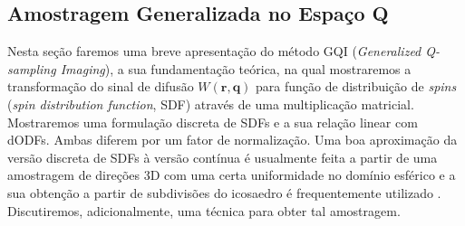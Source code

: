 \documentclass[
    12pt,                %
    oneside,            %
    a4paper,            %
    english,            %
    french,                %
    spanish,            %
    brazil                %
    ]{abntex2}
\begin{document}





\subsection{Amostragem Generalizada no Espaço Q}
\label{sec::gqi}

Nesta seção faremos uma breve apresentação do método GQI (\textit{Generalized Q-sampling Imaging}), a sua fundamentação teórica, na qual mostraremos a transformação do sinal de difusão $W(\mathbf{r},\mathbf{q})$ para função de distribuição de \textit{spins} (\textit{spin distribution function}, SDF) através de uma multiplicação matricial. Mostraremos uma formulação discreta de SDFs e a sua relação linear com dODFs. Ambas diferem 
por um fator de normalização. Uma boa aproximação da versão discreta de SDFs à versão contínua é usualmente feita a partir de uma amostragem de direções 3D com uma certa uniformidade no domínio esférico e a sua obtenção a partir de subdivisões do icosaedro é frequentemente utilizado \cite{tuch2002, TuchQBall2004, descoteaux2007, yeh2010}. Discutiremos, adicionalmente, uma técnica para obter tal amostragem.

\end{document}
